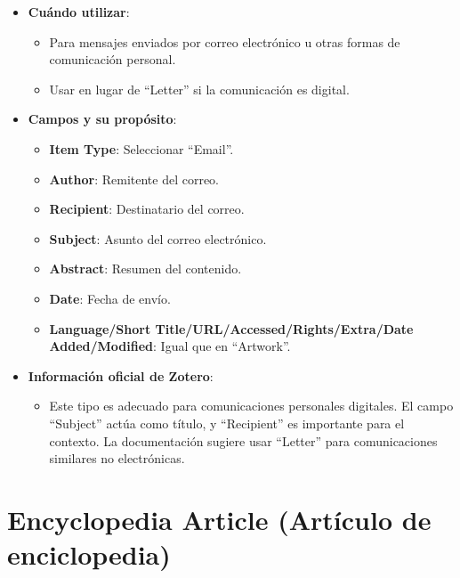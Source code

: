 \documentclass[
  jou,
  floatsintext,
  longtable,
  a4paper,
  nolmodern,
  notxfonts,
  notimes,
  12pt,
  colorlinks=true,linkcolor=blue,citecolor=blue,urlcolor=blue]{apa7}
\providecommand{\tightlist}{%
  \setlength{\itemsep}{0pt}\setlength{\parskip}{0pt}}
\begin{document}
\begin{itemize}
\tightlist
\item
  \textbf{Cuándo utilizar}:

  \begin{itemize}
  \tightlist
  \item
    Para mensajes enviados por correo electrónico u otras formas de
    comunicación personal.
  \item
    Usar en lugar de ``Letter'' si la comunicación es digital.
  \end{itemize}
\item
  \textbf{Campos y su propósito}:

  \begin{itemize}
  \tightlist
  \item
    \textbf{Item Type}: Seleccionar ``Email''.
  \item
    \textbf{Author}: Remitente del correo.
  \item
    \textbf{Recipient}: Destinatario del correo.
  \item
    \textbf{Subject}: Asunto del correo electrónico.
  \item
    \textbf{Abstract}: Resumen del contenido.
  \item
    \textbf{Date}: Fecha de envío.
  \item
    \textbf{Language/Short Title/URL/Accessed/Rights/Extra/Date
    Added/Modified}: Igual que en ``Artwork''.
  \end{itemize}
\item
  \textbf{Información oficial de Zotero}:

  \begin{itemize}
  \tightlist
  \item
    Este tipo es adecuado para comunicaciones personales digitales. El
    campo ``Subject'' actúa como título, y ``Recipient'' es importante
    para el contexto. La documentación sugiere usar ``Letter'' para
    comunicaciones similares no electrónicas.
  \end{itemize}
\end{itemize}

\section{Encyclopedia Article (Artículo de
enciclopedia)}\label{encyclopedia-article-artuxedculo-de-enciclopedia}
\end{document}
